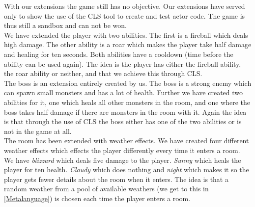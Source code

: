With our extensions the game still has no objective. Our extensions have served only to show the use of the CLS tool to create and test actor code. The game is thus still a sandbox and can not be won.\\
We have extended the player with two abilities. The first is a fireball which deals high damage. The other ability is a roar which makes the player take half damage and healing for ten seconds. Both abilities have a cooldown (time before the ability can be used again). The idea is the player has either the fireball ability, the roar ability or neither, and that we achieve this through CLS.\\
The boss is an extension entirely created by us. The boss is a strong enemy which can spawn small monsters and has a lot of health. Further we have created two abilities for it, one which heals all other monsters in the room, and one where the boss takes half damage if there are monsters in the room with it. Again the idea is that through the use of CLS the boss either has one of the two abilities or is not in the game at all.\\
The room has been extended with weather effects. We have created four different weather effects which effects the player differently every time it enters a room. We have \textit{blizzard} which deals five damage to the player. \textit{Sunny} which heals the player for ten health. \textit{Cloudy} which does nothing and \textit{night} which makes it so the player gets fewer details about the room when it enters. The idea is that a random weather from a pool of available weathers (we get to this in \autoref{Metalanguage}) is chosen each time the player enters a room.\\

